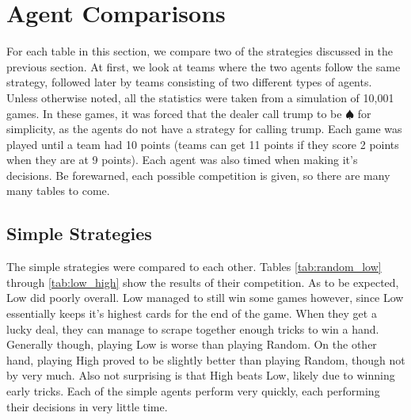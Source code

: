 
\section{Agent Comparisons}

For each table in this section, we compare two of the strategies discussed in the previous section. At first, we look at
teams where the two agents follow the same strategy, followed later by teams consisting of two different types of agents.
Unless otherwise noted, all the statistics were taken from a simulation of 10,001 games. In these games, it was forced
that the dealer call trump to be $\spadesuit$ for simplicity, as the agents do not have a strategy for calling trump.
Each game was played until a team had 10 points (teams can get 11 points if they score 2 points when they are at 9 points).
Each agent was also timed when making it's decisions. Be forewarned, each possible competition is given, so there are many many tables to come.


\subsection{Simple Strategies}

The simple strategies were compared to each other. Tables \ref{tab:random_low} through \ref{tab:low_high} show the results of their competition.
As to be expected, Low did poorly overall. Low managed to still win some games however, since Low essentially keeps it's highest cards for the
end of the game. When they get a lucky deal, they can manage to scrape together enough tricks to win a hand. Generally though, playing Low is
worse than playing Random. On the other hand, playing High proved to be slightly better than playing Random, though not by very much.
Also not surprising is that High beats Low, likely due to winning early tricks. Each of the simple agents perform very quickly, each performing
their decisions in very little time.

